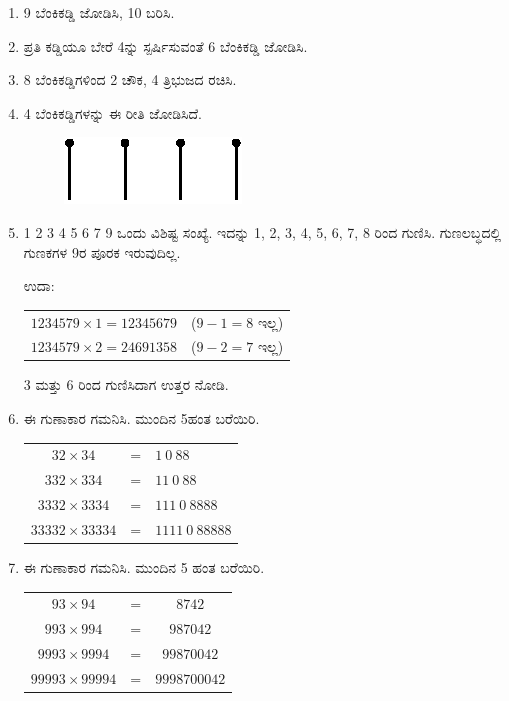 \begin{enumerate}
\item 9 ಬೆಂಕಿಕಡ್ಡಿ ಜೋಡಿಸಿ, 10 ಬರಿಸಿ. 

\item ಪ್ರತಿ ಕಡ್ಡಿಯೂ ಬೇರೆ 4ನ್ನು ಸ್ಪರ್ಷಿಸುವಂತೆ 6 ಬೆಂಕಿಕಡ್ಡಿ ಜೋಡಿಸಿ. 

\item 8 ಬೆಂಕಿಕಡ್ಡಿಗಳಿಂದ 2 ಚೌಕ, 4 ತ್ರಿಭುಜದ ರಚಿಸಿ.

\item 4 ಬೆಂಕಿಕಡ್ಡಿಗಳನ್ನು ಈ ರೀತಿ ಜೋಡಿಸಿದೆ. 
\begin{figure}[H]
\centering
\includegraphics{images/chap12/q12.eps}

\qquad{}
\end{figure}

\item 1 2 3 4 5 6 7 9 ಒಂದು ವಿಶಿಷ್ಟ ಸಂಖ್ಯೆ. ಇದನ್ನು 1, 2, 3, 4, 5, 6, 7, 8 ರಿಂದ ಗುಣಿಸಿ. ಗುಣಲಬ್ಧದಲ್ಲಿ ಗುಣಕಗಳ 9ರ ಪೂರಕ ಇರುವುದಿಲ್ಲ. 

\vskip 0.2cm
ಉದಾ: 
\begin{tabular}[t]{ll}
$1234579\times 1 = 12345679$ & ($9 - 1 = 8$ ಇಲ್ಲ)\\
$1234579\times 2 = 24691358$ & ($9 - 2 = 7$ ಇಲ್ಲ)
\end{tabular}

\vskip 0.1cm
3 ಮತ್ತು 6 ರಿಂದ ಗುಣಿಸಿದಾಗ ಉತ್ತರ ನೋಡಿ. 

\item ಈ ಗುಣಾಕಾರ ಗಮನಿಸಿ. ಮುಂದಿನ 5ಹಂತ ಬರೆಯಿರಿ. 

\begin{tabular}[t]{ccl}
$32\times 34$ & = & $1~0~88$\\
$332\times 334$ & = & $11~0~88$\\
$3332\times 3334$ & = & $111~0~8888$\\
$33332\times 33334$ & = & $1111~0~88888$\\
\end{tabular}

\item ಈ ಗುಣಾಕಾರ ಗಮನಿಸಿ. ಮುಂದಿನ 5 ಹಂತ ಬರೆಯಿರಿ. 

{\fontsize{11pt}{13pt}\selectfont
\begin{tabular}[t]{ccc}
$93\times 94$ & = & $8742$\\
$993\times 994$ & = & $987042$\\
$9993\times 9994$ & = & $99870042$\\
$99993\times 99994$ & = & $9998700042$
\end{tabular}}\relax


\end{enumerate}
